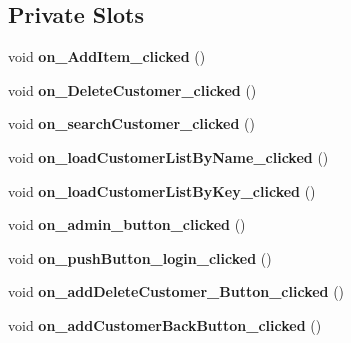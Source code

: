 \subsection*{Private Slots}
\begin{DoxyCompactItemize}
\item 
\mbox{\label{class_main_window_a6ec8f05cde405e7ba6fcee50da8d0caa}} 
void {\bfseries on\+\_\+\+Add\+Item\+\_\+clicked} ()
\item 
\mbox{\label{class_main_window_a55b540480cc9dce7e7529a2382281c46}} 
void {\bfseries on\+\_\+\+Delete\+Customer\+\_\+clicked} ()
\item 
\mbox{\label{class_main_window_aa464beddd4fe4c4404a1d6fd43f02db7}} 
void {\bfseries on\+\_\+search\+Customer\+\_\+clicked} ()
\item 
\mbox{\label{class_main_window_a0686fc967549d67dfdff36cd8707afc3}} 
void {\bfseries on\+\_\+load\+Customer\+List\+By\+Name\+\_\+clicked} ()
\item 
\mbox{\label{class_main_window_a761479ba0c46f0ef0e391c574527df08}} 
void {\bfseries on\+\_\+load\+Customer\+List\+By\+Key\+\_\+clicked} ()
\item 
\mbox{\label{class_main_window_ad329b9928741bf1af1668148b769a7a9}} 
void {\bfseries on\+\_\+admin\+\_\+button\+\_\+clicked} ()
\item 
\mbox{\label{class_main_window_aba26165dc8104d3739fa1c48d1f72178}} 
void {\bfseries on\+\_\+push\+Button\+\_\+login\+\_\+clicked} ()
\item 
\mbox{\label{class_main_window_a4d9ea9d5df8ed5e3c3acd7cecc1384e3}} 
void {\bfseries on\+\_\+add\+Delete\+Customer\+\_\+\+Button\+\_\+clicked} ()
\item 
\mbox{\label{class_main_window_a47fc32380bafe1eec15b68bc5b2827c5}} 
void {\bfseries on\+\_\+add\+Customer\+Back\+Button\+\_\+clicked} ()
\item 
\mbox{\label{class_main_window_a5e4260cf98783e4a26bdd954a79aa9d5}} 

\end{DoxyCompactItemize}
